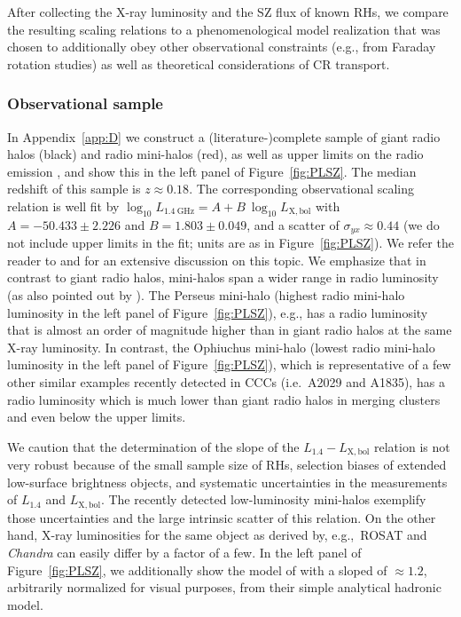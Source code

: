 \documentclass[traditabstract]{aa}
\newcommand{\rmn}{\mathrm}
\begin{document}
After collecting the X-ray luminosity and the SZ flux of known RHs, we compare
the resulting scaling relations to a phenomenological model realization that was
chosen to additionally obey other observational constraints (e.g., from Faraday
rotation studies) as well as theoretical considerations of CR transport.


\subsubsection{Observational sample}

In Appendix~\ref{app:D} we construct a (literature-)complete sample of giant
radio halos (black) and radio mini-halos (red), as well as upper limits on the
radio emission \citep{2009A&A...507..661B, 2011A&A...527A..99E,
  2009A&A...499..371G}, and show this in the left panel of
Figure~\ref{fig:PLSZ}. The median redshift of this sample is $z\approx0.18$. The
corresponding observational scaling relation is well fit by $\log_{10}
L_{1.4~\rmn{GHz}} = A + B~\log_{10} L_{\rmn{X,bol}}$ with $A=-50.433\pm2.226$
and $B=1.803\pm0.049$, and a scatter of $\sigma_{yx} \approx 0.44$ (we do not
include upper limits in the fit; units are as in Figure~\ref{fig:PLSZ}). We
refer the reader to \cite{2009A&A...507..661B} and \cite{2011A&A...527A..99E}
for an extensive discussion on this topic. We emphasize that in contrast to
giant radio halos, mini-halos span a wider range in radio luminosity (as also
pointed out by \cite{2009A&A...499..679M}). The Perseus mini-halo (highest radio
mini-halo luminosity in the left panel of Figure~\ref{fig:PLSZ}), e.g., has a
radio luminosity that is almost an order of magnitude higher than in giant radio
halos at the same X-ray luminosity. In contrast, the Ophiuchus mini-halo (lowest
radio mini-halo luminosity in the left panel of Figure~\ref{fig:PLSZ}), which is
representative of a few other similar examples recently detected in CCCs
(i.e.~A2029 and A1835), has a radio luminosity which is much lower than giant
radio halos in merging clusters and even below the upper limits. 

We caution that the determination of the slope of the $L_{1.4}-L_{\rmn{X,bol}}$
relation is not very robust because of the small sample size of RHs, selection
biases of extended low-surface brightness objects, and systematic uncertainties
in the measurements of $L_{1.4}$ and $L_{\rmn{X,bol}}$. The recently detected
low-luminosity mini-halos exemplify those uncertainties and the large intrinsic
scatter of this relation. On the other hand, X-ray luminosities for the same
object as derived by, e.g.,~ROSAT and \emph{Chandra} can easily differ by a
factor of a few. In the left panel of Figure~\ref{fig:PLSZ}, we additionally
show the model of \citet{2009JCAP...09..024K} with a sloped of $\approx1.2$,
arbitrarily normalized for visual purposes, from their simple analytical
hadronic model.
\end{document}
